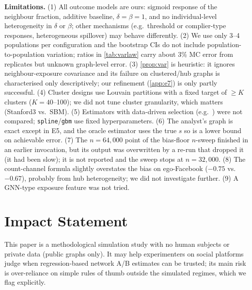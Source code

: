 \documentclass{article}
\theoremstyle{plain}
\theoremstyle{remark}
\begin{document}
\textbf{Limitations.} (1) All outcome models are ours: sigmoid response of the neighbour fraction, additive baseline, $\delta=\beta=1$, and no individual-level heterogeneity in $\delta$ or $\beta$; other mechanisms (e.g.\ threshold or complier-type responses, heterogeneous spillover) may behave differently. (2) We use only 3--4 populations per configuration and the bootstrap CIs do not include population-to-population variation; ratios in \cref{tab:varlaw} carry about 3\% MC error from replicates but unknown graph-level error. (3) \cref{prop:var} is heuristic: it ignores neighbour-exposure covariance and its failure on clustered/hub graphs is characterised only descriptively; our refinement (\cref{app:e7}) is only partly successful. (4) Cluster designs use Louvain partitions with a fixed target of $\ge K$ clusters ($K=40$--100); we did not tune cluster granularity, which matters (Stanford3 vs.\ SBM). (5) Estimators with data-driven selection (e.g.\ \citealp{han2023}) were not compared; \texttt{spline}/\texttt{gbm} use fixed hyperparameters. (6) The analyst's graph is exact except in E5, and the oracle estimator uses the true $s$ so is a lower bound on achievable error. (7) The $n=64{,}000$ point of the bias-floor $n$-sweep finished in an earlier invocation, but its output was overwritten by a re-run that dropped it (it had been slow); it is not reported and the sweep stops at $n=32{,}000$. (8) The count-channel formula slightly overstates the bias on ego-Facebook ($-0.75$ vs.\ $-0.67$), probably from hub heterogeneity; we did not investigate further. (9) A GNN-type exposure feature \citep{kipf2017} was not tried.

\section*{Impact Statement}
This paper is a methodological simulation study with no human subjects or private data (public graphs only). It may help experimenters on social platforms judge when regression-based network A/B estimates can be trusted; its main risk is over-reliance on simple rules of thumb outside the simulated regimes, which we flag explicitly.




\newpage
\appendix
\onecolumn
\end{document}
